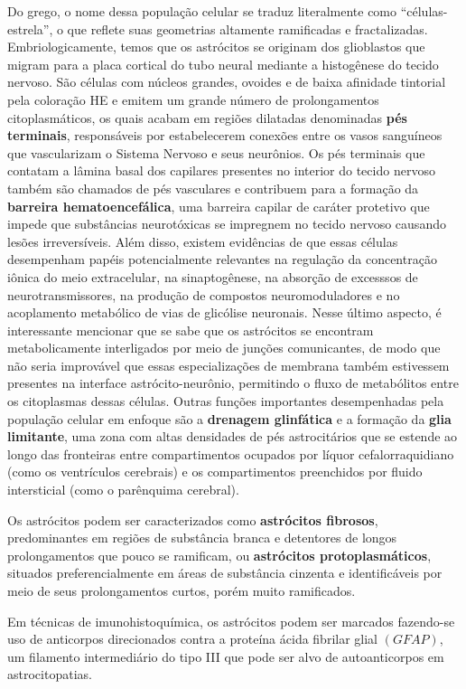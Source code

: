 \documentclass[
]{book}
\theoremstyle{definition}
\theoremstyle{definition}
\theoremstyle{definition}
\theoremstyle{definition}
\theoremstyle{remark}
\begin{document}
Do grego, o nome dessa população celular se traduz literalmente como ``células-estrela'', o que reflete suas geometrias altamente ramificadas e fractalizadas. Embriologicamente, temos que os astrócitos se originam dos glioblastos que migram para a placa cortical do tubo neural mediante a histogênese do tecido nervoso. São células com núcleos grandes, ovoides e de baixa afinidade tintorial pela coloração HE e emitem um grande número de prolongamentos citoplasmáticos, os quais acabam em regiões dilatadas denominadas \textbf{pés terminais}, responsáveis por estabelecerem conexões entre os vasos sanguíneos que vascularizam o Sistema Nervoso e seus neurônios. Os pés terminais que contatam a lâmina basal dos capilares presentes no interior do tecido nervoso também são chamados de pés vasculares e contribuem para a formação da \textbf{barreira hematoencefálica}, uma barreira capilar de caráter protetivo que impede que substâncias neurotóxicas se impregnem no tecido nervoso causando lesões irreversíveis. Além disso, existem evidências de que essas células desempenham papéis potencialmente relevantes na regulação da concentração iônica do meio extracelular, na sinaptogênese, na absorção de excesssos de neurotransmissores, na produção de compostos neuromoduladores e no acoplamento metabólico de vias de glicólise neuronais. Nesse último aspecto, é interessante mencionar que se sabe que os astrócitos se encontram metabolicamente interligados por meio de junções comunicantes, de modo que não seria improvável que essas especializações de membrana também estivessem presentes na interface astrócito-neurônio, permitindo o fluxo de metabólitos entre os citoplasmas dessas células. Outras funções importantes desempenhadas pela população celular em enfoque são a \textbf{drenagem glinfática} e a formação da \textbf{glia limitante}, uma zona com altas densidades de pés astrocitários que se estende ao longo das fronteiras entre compartimentos ocupados por líquor cefalorraquidiano (como os ventrículos cerebrais) e os compartimentos preenchidos por fluido intersticial (como o parênquima cerebral).

Os astrócitos podem ser caracterizados como \textbf{astrócitos fibrosos}, predominantes em regiões de substância branca e detentores de longos prolongamentos que pouco se ramificam, ou \textbf{astrócitos protoplasmáticos}, situados preferencialmente em áreas de substância cinzenta e identificáveis por meio de seus prolongamentos curtos, porém muito ramificados.

Em técnicas de imunohistoquímica, os astrócitos podem ser marcados fazendo-se uso de anticorpos direcionados contra a proteína ácida fibrilar glial \((GFAP)\), um filamento intermediário do tipo III que pode ser alvo de autoanticorpos em astrocitopatias.
\end{document}
